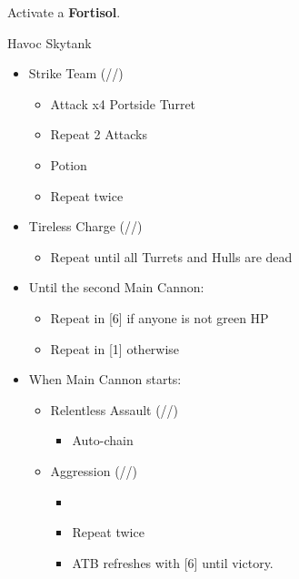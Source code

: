 \begin{multicols}{2}
\renewcommand{\first}{[1] Aggression (\com/\com/\rav)}
\renewcommand{\second}{[2] Relentless Assault (\rav/\com/\rav)}
\renewcommand{\third}{[3] Aggression (\com/\com/\rav)}
\renewcommand{\fourth}{[4] Tireless Charge (\com/\com/\med)}
\renewcommand{\fifth}{[5] Strike Team (\com/\com/\syn)}
\renewcommand{\sixth}{[6] Tireless Charge (\com/\com/\med)}

Activate a \textbf{Fortisol}.

\begin{battle}{Havoc Skytank}
\begin{itemize}
    \item \fifth
    \begin{itemize}
        \item Attack x4 Portside Turret
        \item Repeat 2 Attacks
        \item Potion
        \item Repeat twice
    \end{itemize}
    \item \sixth
    \begin{itemize}
        \item Repeat until all Turrets and Hulls are dead
    \end{itemize}
    \item Until the second Main Cannon:
    \begin{itemize}
        \item Repeat in [6] if anyone is not green HP
        \item Repeat in [1] otherwise
    \end{itemize}
    \item When Main Cannon starts:
    \begin{itemize}
        \item \begin{flushleft} \second \end{flushleft}
        \begin{itemize}
            \item Auto-chain
        \end{itemize}
        \item \first
        \begin{itemize}
            \item \stagger
            \item Repeat twice
            \item ATB refreshes with [6] until victory.
        \end{itemize}
    \end{itemize}
\end{itemize}
\end{battle}
\end{multicols}